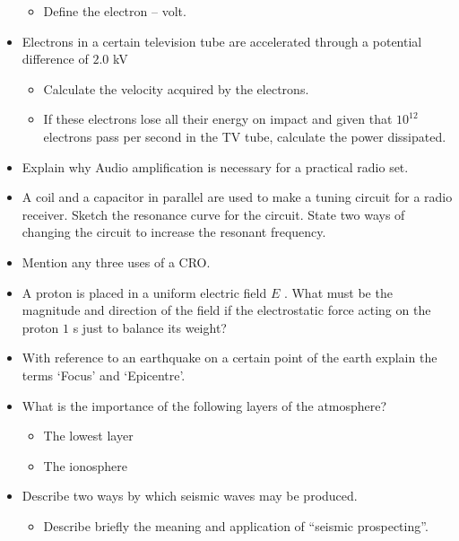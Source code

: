 \documentclass{article}
\begin{document}
\begin{itemize}
 \begin{itemize}
\item Define the electron – volt.
\end{itemize}
\item Electrons in a certain television tube are accelerated through a potential difference of $ 2.0$ kV
 \begin{itemize}
\item Calculate the velocity acquired by the electrons.
\item If these electrons lose all their energy on impact and given that $ 10^{12}$ electrons pass per second in the TV tube, calculate the power dissipated.
\end{itemize}
\item Explain why Audio amplification is necessary for a practical radio set.
\item A coil and a capacitor in parallel are used to make a tuning circuit for a radio receiver. Sketch the resonance curve for the circuit. State two ways of changing the circuit to increase the resonant frequency.
\item Mention any three uses of a CRO.
\item A proton is placed in a uniform electric field $ E$ . What must be the magnitude and direction of the field if the electrostatic force acting on the proton $ 1$ s just to balance its weight?
\item With reference to an earthquake on a certain point of the earth explain the terms ‘Focus’ and ‘Epicentre’.
\item What is the importance of the following layers of the atmosphere?
 \begin{itemize}
\item The lowest layer
\item The ionosphere
\end{itemize}
\item Describe two ways by which seismic waves may be produced.
 \begin{itemize}
\item Describe briefly the meaning and application of “seismic prospecting”. 
\end{itemize}
\end{itemize}
\end{document}
